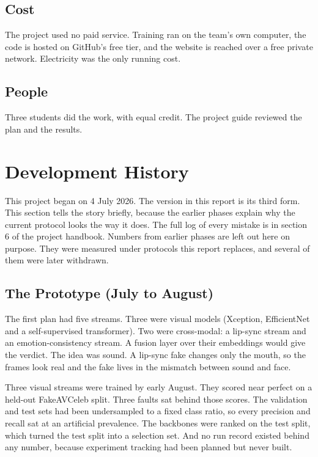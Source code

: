 \subsection{Cost}

The project used no paid service. Training ran on the team's own computer,
the code is hosted on GitHub's free tier, and the website is reached over a
free private network. Electricity was the only running cost.

\subsection{People}

Three students did the work, with equal credit. The project guide reviewed
the plan and the results.

\section{Development History}
\label{ch:history}

This project began on 4 July 2026. The version in this report is its third
form. This section tells the story briefly, because the earlier phases explain
why the current protocol looks the way it does. The full log of every mistake
is in section 6 of the project handbook. Numbers from earlier phases are left
out here on purpose. They were measured under protocols this report replaces,
and several of them were later withdrawn.

\subsection{The Prototype (July to August)}

The first plan had five streams. Three were visual models (Xception,
EfficientNet and a self-supervised transformer). Two were cross-modal: a
lip-sync stream and an emotion-consistency stream. A fusion layer over their
embeddings would give the verdict. The idea was sound. A lip-sync fake changes
only the mouth, so the frames look real and the fake lives in the mismatch
between sound and face.

Three visual streams were trained by early August. They scored near perfect
on a held-out FakeAVCeleb split. Three faults sat behind those scores. The
validation and test sets had been undersampled to a fixed class ratio, so
every precision and recall sat at an artificial prevalence. The backbones were
ranked on the test split, which turned the test split into a selection set.
And no run record existed behind any number, because experiment tracking had
been planned but never built.

